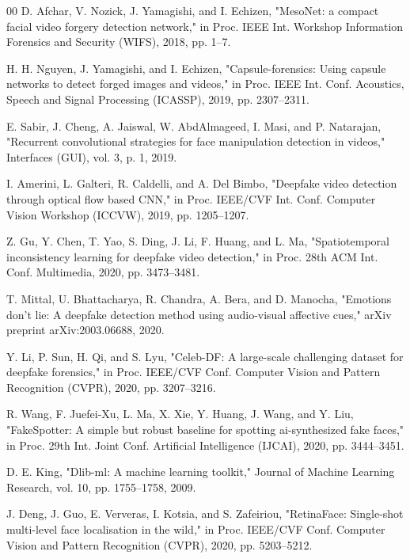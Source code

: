 \documentclass[conference]{IEEEtran}
\begin{document}
\begin{thebibliography}{00}
 D. Afchar, V. Nozick, J. Yamagishi, and I. Echizen, "MesoNet: a compact facial video forgery detection network," in Proc. IEEE Int. Workshop Information Forensics and Security (WIFS), 2018, pp. 1–7.

 H. H. Nguyen, J. Yamagishi, and I. Echizen, "Capsule-forensics: Using capsule networks to detect forged images and videos," in Proc. IEEE Int. Conf. Acoustics, Speech and Signal Processing (ICASSP), 2019, pp. 2307–2311.

 E. Sabir, J. Cheng, A. Jaiswal, W. AbdAlmageed, I. Masi, and P. Natarajan, "Recurrent convolutional strategies for face manipulation detection in videos," Interfaces (GUI), vol. 3, p. 1, 2019.

 I. Amerini, L. Galteri, R. Caldelli, and A. Del Bimbo, "Deepfake video detection through optical flow based CNN," in Proc. IEEE/CVF Int. Conf. Computer Vision Workshop (ICCVW), 2019, pp. 1205–1207.

 Z. Gu, Y. Chen, T. Yao, S. Ding, J. Li, F. Huang, and L. Ma, "Spatiotemporal inconsistency learning for deepfake video detection," in Proc. 28th ACM Int. Conf. Multimedia, 2020, pp. 3473–3481.

 T. Mittal, U. Bhattacharya, R. Chandra, A. Bera, and D. Manocha, "Emotions don't lie: A deepfake detection method using audio-visual affective cues," arXiv preprint arXiv:2003.06688, 2020.

 Y. Li, P. Sun, H. Qi, and S. Lyu, "Celeb-DF: A large-scale challenging dataset for deepfake forensics," in Proc. IEEE/CVF Conf. Computer Vision and Pattern Recognition (CVPR), 2020, pp. 3207–3216.

 R. Wang, F. Juefei-Xu, L. Ma, X. Xie, Y. Huang, J. Wang, and Y. Liu, "FakeSpotter: A simple but robust baseline for spotting ai-synthesized fake faces," in Proc. 29th Int. Joint Conf. Artificial Intelligence (IJCAI), 2020, pp. 3444–3451.

 D. E. King, "Dlib-ml: A machine learning toolkit," Journal of Machine Learning Research, vol. 10, pp. 1755–1758, 2009.

 J. Deng, J. Guo, E. Ververas, I. Kotsia, and S. Zafeiriou, "RetinaFace: Single-shot multi-level face localisation in the wild," in Proc. IEEE/CVF Conf. Computer Vision and Pattern Recognition (CVPR), 2020, pp. 5203–5212.


\end{thebibliography}
\end{document}
